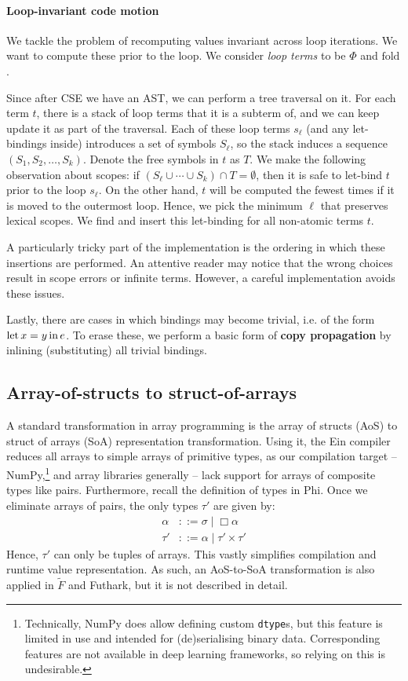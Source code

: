 \paragraph{Loop-invariant code motion} We tackle the problem of recomputing values invariant across loop iterations. We want to compute these prior to the loop. We consider \textit{loop terms} to be $\Phi$ and $\mathrm{fold}$. 

Since after CSE we have an AST, we can perform a tree traversal on it. For each term $t$, there is a stack of loop terms that it is a subterm of, and we can keep update it as part of the traversal. Each of these loop terms $s_\ell$ (and any let-bindings inside) introduces a set of symbols $S_\ell$, so the stack induces a sequence $(S_1, S_2, \dots, S_k)$. Denote the free symbols in $t$ as $T$. We make the following observation about scopes: if $\left( S_\ell \cup \cdots \cup S_k \right) \cap T = \emptyset$, then it is safe to let-bind $t$ prior to the loop $s_\ell$. On the other hand, $t$ will be computed the fewest times if it is moved to the outermost loop. Hence, we pick the minimum $\ell$ that preserves lexical scopes. We find and insert this let-binding for all non-atomic terms $t$.

A particularly tricky part of the implementation is the ordering in which these insertions are performed. An attentive reader may notice that the wrong choices result in scope errors or infinite terms. However, a careful implementation avoids these issues. 

Lastly, there are cases in which bindings may become trivial, i.e. of the form $\mathrm{let}\,{x}={y}\,\mathrm{in}\,{e}$. To erase these, we perform a basic form of \textbf{copy propagation} by inlining (substituting) all trivial bindings.

\subsection{Array-of-structs to struct-of-arrays}

A standard transformation in array programming is the array of structs (AoS) to struct of arrays (SoA) representation transformation. Using it, the Ein compiler reduces all arrays to simple arrays of primitive types, as our compilation target -- NumPy,\footnote{Technically, NumPy does allow defining custom \texttt{dtype}s, but this feature is limited in use and intended for (de)serialising binary data. Corresponding features are not available in deep learning frameworks, so relying on this is undesirable.} and array libraries generally -- lack support for arrays of composite types like pairs. Furthermore, recall the definition of types in Phi. Once we eliminate arrays of pairs, the only types $\tau'$ are given by:
\begin{align*}
\alpha &::= \sigma \mid \Box \alpha \\
\tau' &::= \alpha \mid \tau' \times \tau'
\end{align*}
Hence, $\tau'$ can only be tuples of arrays. This vastly simplifies compilation and runtime value representation. As such, an AoS-to-SoA transformation is also applied in $\tilde F$ and Futhark, but it is not described in detail. 

